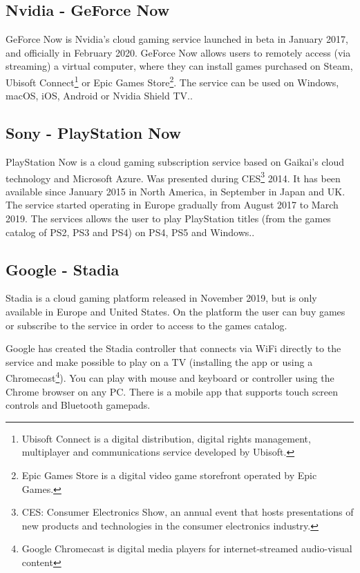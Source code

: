 \subsection{Nvidia - GeForce Now}
GeForce Now is Nvidia's cloud gaming service launched in beta in January 2017, and officially in February 2020. GeForce Now allows users to remotely access (via streaming) a virtual computer, where they can install games purchased on Steam, Ubisoft Connect\footnote{Ubisoft Connect is a digital distribution, digital rights management, multiplayer and communications service developed by Ubisoft.} or Epic Games Store\footnote{Epic Games Store is a digital video game storefront operated by Epic Games.}. The service can be used on Windows, macOS, iOS, Android or Nvidia Shield TV.\cite{GeForce_Now}.

\subsection{Sony - PlayStation Now}
PlayStation Now is a cloud gaming subscription service based on Gaikai's cloud technology and Microsoft Azure. Was presented during CES\footnote{CES: Consumer Electronics Show, an annual event that hosts presentations of new products and technologies in the consumer electronics industry.} 2014. It has been available since January 2015 in North America, in September in Japan and UK. The service started operating in Europe gradually from August 2017 to March 2019. The services allows the user to play PlayStation titles (from the games catalog of PS2, PS3 and PS4) on PS4, PS5 and Windows.\cite{PlayStation_Now}.

\subsection{Google - Stadia}
Stadia is a cloud gaming platform released in November 2019, but is only available in Europe and United States. On the platform the user can buy games or subscribe to the service in order to access to the games catalog.

Google has created the Stadia controller that connects via WiFi directly to the service and make possible to play on a TV (installing the app or using a Chromecast\footnote{Google Chromecast is digital media players for internet-streamed audio-visual content}). You can play with mouse and keyboard or controller using the Chrome browser on any PC. There is a mobile app that supports touch screen controls and Bluetooth gamepads.

